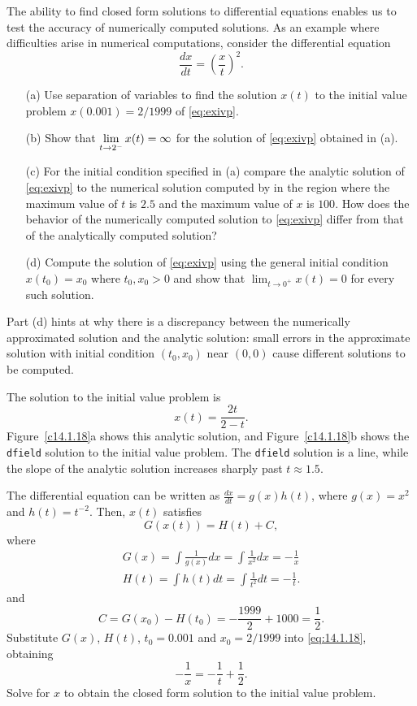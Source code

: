 \documentclass{ximera}
\begin{document}
\begin{exercise} \label{c14.1.18}
The ability to find closed form solutions to differential equations enables
us to test the accuracy of numerically computed solutions.  As an example where difficulties arise in numerical computations, consider the differential 
equation
\begin{equation} \label{eq:exivp}
\frac{dx}{dt} = \left(\frac{x}{t}\right)^2.
\end{equation}
\begin{itemize}
\item[(a)] Use separation of variables to find the solution $x(t)$ to the 
initial value problem $x(0.001) = 2/1999$ of \eqref{eq:exivp}.
\item[(b)] Show that $\displaystyle\lim_{t\to 2^-}x(t)=\infty$ for the solution of 
\eqref{eq:exivp} obtained in (a).
\item[(c)] For the initial condition specified in (a) compare the analytic 
solution of \eqref{eq:exivp} to the numerical solution computed by {\dfield} 
in the region where the maximum value of $t$ is $2.5$ and the maximum value of 
$x$ is $100$.  How does the behavior of the numerically computed solution 
to \eqref{eq:exivp} differ from that of the analytically computed solution?
\item[(d)]  Compute the solution of \eqref{eq:exivp} using the general initial 
condition $x(t_0) = x_0$ where $t_0,x_0>0$ and show that 
$\lim_{t\to 0^+}x(t)=0$ for every such solution. 
\end{itemize}
 Part (d) hints at why there is a discrepancy 
between the numerically approximated solution and the analytic solution: 
small errors in the approximate solution with initial condition $(t_0,x_0)$ 
near $(0,0)$ cause different solutions to be computed.

\begin{solution}
\ans The solution to the initial value problem is
\[
x(t) = \frac{2t}{2 - t}.
\]
Figure~\ref{c14.1.18}a shows this analytic solution, and
Figure~\ref{c14.1.18}b shows the {\tt dfield} solution to the initial
value problem.  The {\tt dfield} solution is a line, while the slope
of the analytic solution increases sharply past $t \approx 1.5$.

\soln The differential equation can be written as $\frac{dx}{dt} = g(x)h(t)$,
where $g(x) = x^2$ and $h(t) = t^{-2}$.  Then, $x(t)$ satisfies
\begin{equation} \label{eq:14.1.18}
G(x(t)) = H(t) + C,
\end{equation}
where
\[
\begin{array}{l}
G(x) = \int\frac{1}{g(x)}dx = \int\frac{1}{x^2}dx = -\frac{1}{x} \\
H(t) = \int h(t)dt = \int\frac{1}{t^2}dt = -\frac{1}{t}.
\end{array}
\]
and
\[
C = G(x_0) - H(t_0) = -\frac{1999}{2} + 1000  = \frac{1}{2}.
\]
Substitute $G(x)$, $H(t)$, $t_0 = 0.001$ and $x_0 = 2/1999$ into
\eqref{eq:14.1.18}, obtaining
\[
-\frac{1}{x} = -\frac{1}{t} + \frac{1}{2}.
\]
Solve for $x$ to obtain the closed form solution to the initial value problem.


\end{solution}
\end{exercise}
\end{document}

